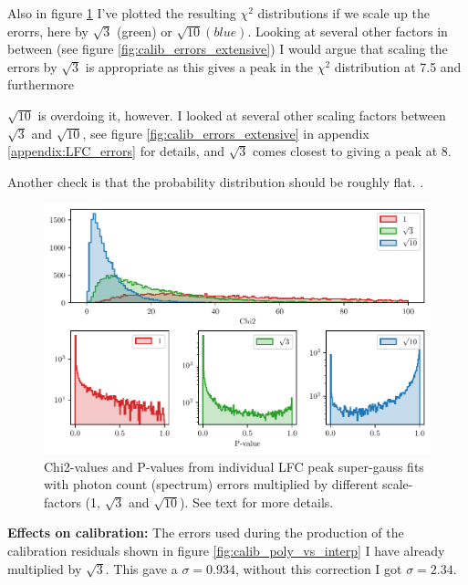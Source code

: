     
    Also in figure \ref{fig:calib_errors} I've plotted the resulting $\chi^2$ distributions if we scale up the erorrs, here by $\sqrt{3}$ (green) or $\sqrt{10} (blue)$. Looking at several other factors in between (see figure \ref{fig:calib_errors_extensive}) I would argue that scaling the errors by $\sqrt{3}$ is appropriate as this gives a peak in the $\chi^2$ distribution at 7.5 and furthermore 
    
    
    $\sqrt{10}$ is overdoing it, however. I looked at several other scaling factors between $\sqrt{3}$ and $\sqrt{10}$, see figure \ref{fig:calib_errors_extensive} in appendix \ref{appendix:LFC_errors} for details, and $\sqrt{3}$ comes closest to giving a peak at 8.
    
    Another check is that the probability distribution should be roughly flat. .
    
    \begin{figure}%
        \begin{wide}  
            \includegraphics[width=\textwidth]{figures/calib_errors2.pdf}
            \caption{Chi2-values and P-values from individual LFC peak super-gauss fits with photon count (spectrum) errors multiplied by different scale-factors (1, $\sqrt{3}$ and $\sqrt{10}$). See text for more details.}
        \label{fig:calib_errors}
        \end{wide}
    \end{figure}
    
    \bigbreak

    \noindent \textbf{Effects on calibration:} \newline
    The errors used during the production of the calibration residuals shown in figure \ref{fig:calib_poly_vs_interp} I have already multiplied by $\sqrt{3}$. This gave a $\sigma = 0.934$, without this correction I got $\sigma = 2.34$. 

